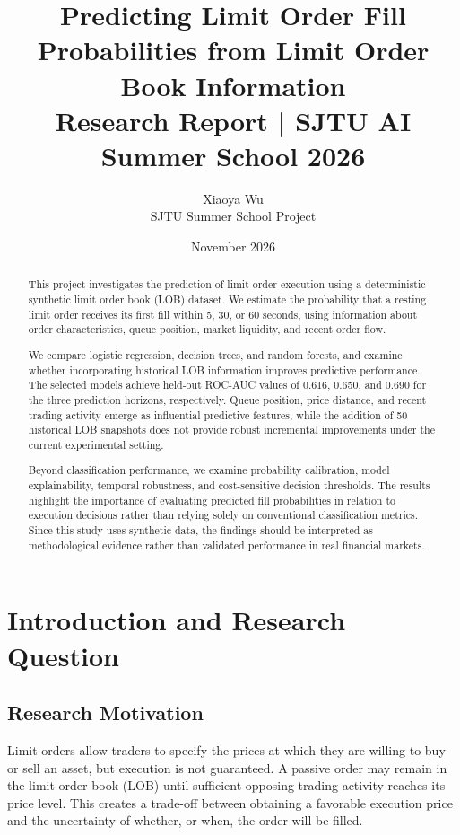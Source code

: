 \documentclass[11pt,a4paper]{article}
\title{Predicting Limit Order Fill Probabilities
	from Limit Order Book Information\\
	\large Research Report | SJTU AI Summer School 2026}
\author{Xiaoya Wu\\SJTU Summer School Project}
\date{November 2026 }
\begin{document}
	\maketitle
	
	\begin{abstract}
		This project investigates the prediction of limit-order execution
		using a deterministic synthetic limit order book (LOB) dataset.
		We estimate the probability that a resting limit order receives
		its first fill within 5, 30, or 60 seconds, using information
		about order characteristics, queue position, market liquidity,
		and recent order flow.
		
		We compare logistic regression, decision trees, and random
		forests, and examine whether incorporating historical LOB
		information improves predictive performance. The selected
		models achieve held-out ROC-AUC values of 0.616, 0.650,
		and 0.690 for the three prediction horizons, respectively.
		Queue position, price distance, and recent trading activity
		emerge as influential predictive features, while the addition
		of 50 historical LOB snapshots does not provide robust
		incremental improvements under the current experimental setting.
		
		Beyond classification performance, we examine probability
		calibration, model explainability, temporal robustness,
		and cost-sensitive decision thresholds. The results highlight
		the importance of evaluating predicted fill probabilities
		in relation to execution decisions rather than relying solely
		on conventional classification metrics. Since this study
		uses synthetic data, the findings should be interpreted
		as methodological evidence rather than validated performance
		in real financial markets.
	\end{abstract}


\section{Introduction and Research Question}

\subsection{Research Motivation}

Limit orders allow traders to specify the prices at which
they are willing to buy or sell an asset, but execution is
not guaranteed. A passive order may remain in the limit
order book (LOB) until sufficient opposing trading activity
reaches its price level. This creates a trade-off between
obtaining a favorable execution price and the uncertainty
of whether, or when, the order will be filled.
\end{document}
